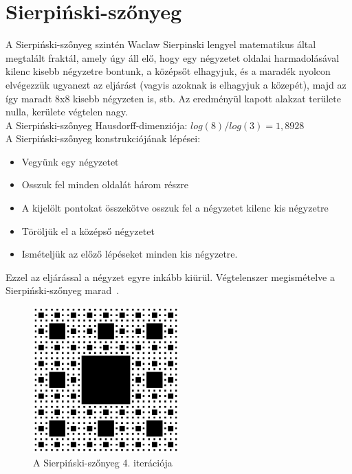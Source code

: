 \section{Sierpiński-szőnyeg}
A Sierpiński-szőnyeg szintén Waclaw Sierpinski lengyel matematikus által megtalált fraktál, amely úgy áll elő, hogy egy négyzetet oldalai harmadolásával kilenc kisebb négyzetre bontunk, a középsőt elhagyjuk, és a maradék nyolcon elvégezzük ugyanezt az eljárást (vagyis azoknak is elhagyjuk a közepét), majd az így maradt 8x8 kisebb négyzeten is, stb. Az eredményül kapott alakzat területe nulla, kerülete végtelen nagy.\\ 
A Sierpiński-szőnyeg Hausdorff-dimenziója: $log(8)/log(3) = 1,8928$
\\A Sierpiński-szőnyeg konstrukciójának lépései:
\begin{itemize}
	\item Vegyünk egy négyzetet
	\item Osszuk fel minden oldalát három részre
	\item A kijelölt pontokat összekötve osszuk fel a négyzetet kilenc kis négyzetre
	\item Töröljük el a középső négyzetet
	\item Ismételjük az előző lépéseket minden kis négyzetre.
\end{itemize}
Ezzel az eljárással a négyzet egyre inkább kiürül. Végtelenszer megismételve a Sierpiński-szőnyeg marad~\cite{sierp-carpet-wiki}.
\begin{figure}[!ht]
	\begin{center}
		\includegraphics[width=0.5\textwidth]{img/SierpinskiCarpet}
		\caption[labelInTOC]{A Sierpiński-szőnyeg 4. iterációja}
	\end{center}
\end{figure}
